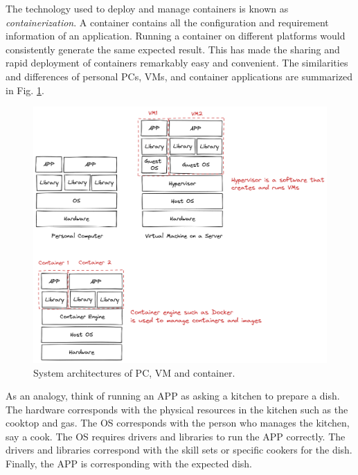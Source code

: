 The technology used to deploy and manage containers is known as \textit{containerization}. A container contains all the configuration and requirement information of an application. Running a container on different platforms would consistently generate the same expected result. This has made the sharing and rapid deployment of containers remarkably easy and convenient. The similarities and differences of personal PCs, VMs, and container applications are summarized in Fig. \ref{ch:vac:fig:pcvmcontainersructure}.

\begin{figure}
	\centering
	\includegraphics[width=350pt]{chapters/part-3/figures/pcvmcontainerstructure.png}
	\caption{System architectures of PC, VM and container.} \label{ch:vac:fig:pcvmcontainersructure}
\end{figure}

As an analogy, think of running an APP as asking a kitchen to prepare a dish. The hardware corresponds with the physical resources in the kitchen such as the cooktop and gas. The OS corresponds with the person who manages the kitchen, say a cook. The OS requires drivers and libraries to run the APP correctly. The drivers and libraries correspond with the skill sets or specific cookers for the dish. Finally, the APP is corresponding with the expected dish.

